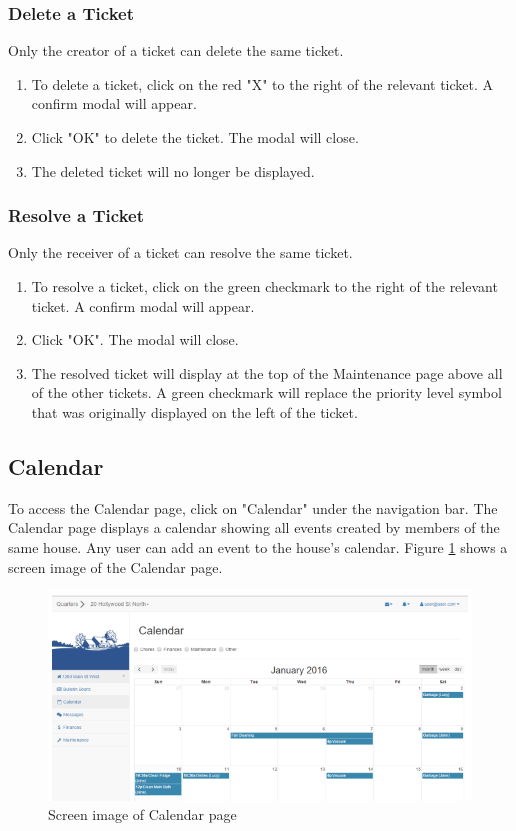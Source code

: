 \documentclass[12pt]{article}
\begin{document}
    \subsubsection{Delete a Ticket}
    Only the creator of a ticket can delete the same ticket.
    \begin{enumerate}
        \item To delete a ticket, click on the red "X" to the right of the relevant ticket. A confirm modal will appear.
        \item Click "OK" to delete the ticket. The modal will close.
        \item The deleted ticket will no longer be displayed.
    \end{enumerate}
    
    \subsubsection{Resolve a Ticket}
    Only the receiver of a ticket can resolve the same ticket.
    \begin{enumerate}
        \item To resolve a ticket, click on the green checkmark to the right of the relevant ticket. A confirm modal will appear.
        \item Click "OK". The modal will close.
        \item The resolved ticket will display at the top of the Maintenance page above all of the other tickets. A green checkmark will replace the priority level symbol that was originally displayed on the left of the ticket.
    \end{enumerate}
    
    
    \subsection{Calendar}
    To access the Calendar page, click on "Calendar" under the navigation bar. The Calendar page displays a calendar showing all events created by members of the same house. Any user can add an event to the house's calendar. Figure \ref{fig:calendar} shows a screen image of the Calendar page.
    
    \begin{figure}
        \centering
        \includegraphics[width=\textwidth]{calendar}
        \caption{Screen image of Calendar page}
        \label{fig:calendar}
    \end{figure}
    
\end{document}
